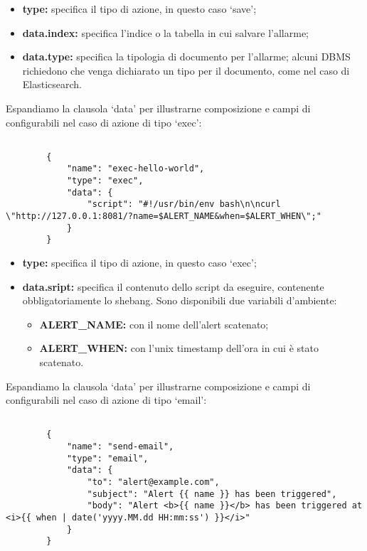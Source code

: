 	\begin{itemize}
                \item \textbf{type:} specifica il tipo di azione, in questo caso `save';
                \item \textbf{data.index:} specifica l'indice o la tabella in cui salvare l'allarme;
                \item \textbf{data.type:} specifica la tipologia di documento per l'allarme; alcuni DBMS richiedono che venga dichiarato un tipo per il documento, come nel caso di Elasticsearch.
	\end{itemize}


	Espandiamo la clausola `data' per illustrarne composizione e campi di configurabili nel caso di azione di tipo `exec':

	\begin{lstlisting}[style=json]

		{
			"name": "exec-hello-world",
			"type": "exec",
			"data": {
				"script": "#!/usr/bin/env bash\n\ncurl \"http://127.0.0.1:8081/?name=$ALERT_NAME&when=$ALERT_WHEN\";"
			}
		}
	\end{lstlisting}


	\begin{itemize}
                \item \textbf{type:} specifica il tipo di azione, in questo caso `exec';
                \item \textbf{data.sript:} specifica il contenuto dello script da eseguire, contenente obbligatoriamente lo shebang. Sono disponibili due variabili d'ambiente:
			\begin{itemize}
                		\item \textbf{ALERT\_NAME:} con il nome dell'alert scatenato;
                		\item \textbf{ALERT\_WHEN:} con l'unix timestamp dell'ora in cui è stato scatenato.
       			\end{itemize}
	\end{itemize}


	Espandiamo la clausola `data' per illustrarne composizione e campi di configurabili nel caso di azione di tipo `email':

	\begin{lstlisting}[style=json]

		{
			"name": "send-email",
			"type": "email",
			"data": {
				"to": "alert@example.com",
				"subject": "Alert {{ name }} has been triggered",
				"body": "Alert <b>{{ name }}</b> has been triggered at <i>{{ when | date('yyyy.MM.dd HH:mm:ss') }}</i>"
			}
		}
	\end{lstlisting}


